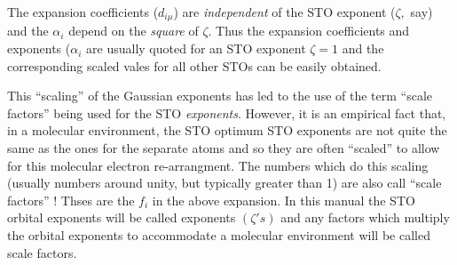 The expansion coefficients ($d_{i\mu}$) are {\em independent} of the STO
exponent ($\zeta , $ say) and the $\alpha_i$ depend on the {\em square}
of $\zeta$. Thus the expansion coefficients and exponents ($\alpha_i$
are usually quoted for an STO exponent $\zeta = 1$ and the corresponding
scaled vales for all other STOs
can be easily obtained.

This ``scaling'' of the Gaussian exponents has led to
the use of the term ``scale factors'' being used for the
STO {\em exponents}. However, it is an empirical fact that, in
a molecular environment, the STO optimum STO exponents
are not quite the same as the ones for the separate atoms and so
they are often ``scaled'' to allow for this molecular
electron re-arrangment. The numbers which do this scaling
(usually numbers around unity, but typically greater than 1)
are also call ``scale factors'' ! Thses are the $f_i$ in
the above expansion.
In this manual the STO orbital exponents will be called 
exponents $(\zeta 's)$ and any factors which multiply
the orbital exponents to accommodate a molecular environment
will be called scale factors.

